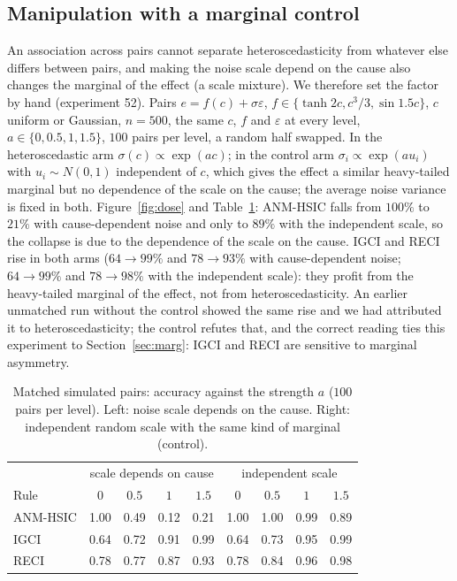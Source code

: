 \subsection{Manipulation with a marginal control}\label{sec:dose}
An association across pairs cannot separate heteroscedasticity from whatever else differs between pairs, and making the noise scale depend on the cause also changes the marginal of the effect (a scale mixture). We therefore set the factor by hand (experiment 52). Pairs $e=f(c)+\sigma\varepsilon$, $f\in\{\tanh 2c,c^3/3,\sin 1.5c\}$, $c$ uniform or Gaussian, $n=500$, the same $c$, $f$ and $\varepsilon$ at every level, $a\in\{0,0.5,1,1.5\}$, $100$ pairs per level, a random half swapped. In the heteroscedastic arm $\sigma(c)\propto\exp(ac)$; in the control arm $\sigma_i\propto\exp(au_i)$ with $u_i\sim N(0,1)$ independent of $c$, which gives the effect a similar heavy-tailed marginal but no dependence of the scale on the cause; the average noise variance is fixed in both. Figure~\ref{fig:dose} and Table~\ref{tab:dose}: ANM-HSIC falls from $100\%$ to $21\%$ with cause-dependent noise and only to $89\%$ with the independent scale, so the collapse is due to the dependence of the scale on the cause. IGCI and RECI rise in both arms ($64\to99\%$ and $78\to93\%$ with cause-dependent noise; $64\to99\%$ and $78\to98\%$ with the independent scale): they profit from the heavy-tailed marginal of the effect, not from heteroscedasticity. An earlier unmatched run without the control showed the same rise and we had attributed it to heteroscedasticity; the control refutes that, and the correct reading ties this experiment to Section~\ref{sec:marg}: IGCI and RECI are sensitive to marginal asymmetry.

\begin{table}[t]
\caption{Matched simulated pairs: accuracy against the strength $a$ ($100$ pairs per level). Left: noise scale depends on the cause. Right: independent random scale with the same kind of marginal (control).}
\label{tab:dose}
\small
\begin{tabular}{@{}lcccc|cccc@{}}
\toprule
 & \multicolumn{4}{c|}{scale depends on cause} & \multicolumn{4}{c}{independent scale}\\
Rule & $0$ & $0.5$ & $1$ & $1.5$ & $0$ & $0.5$ & $1$ & $1.5$\\
\midrule
ANM-HSIC & 1.00 & 0.49 & 0.12 & 0.21 & 1.00 & 1.00 & 0.99 & 0.89\\
IGCI & 0.64 & 0.72 & 0.91 & 0.99 & 0.64 & 0.73 & 0.95 & 0.99\\
RECI & 0.78 & 0.77 & 0.87 & 0.93 & 0.78 & 0.84 & 0.96 & 0.98\\
\bottomrule
\end{tabular}
\end{table}

